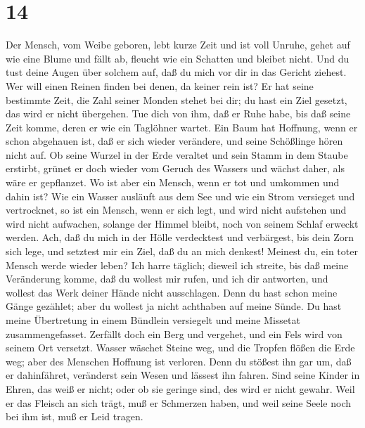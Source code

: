 \hypertarget{section-13}{%
\section{14}\label{section-13}}

 Der Mensch, vom Weibe geboren, lebt kurze Zeit und ist voll
Unruhe,  gehet auf wie eine Blume und fällt ab, fleucht wie
ein Schatten und bleibet nicht.  Und du tust deine Augen
über solchem auf, daß du mich vor dir in das Gericht ziehest.
 Wer will einen Reinen finden bei denen, da keiner rein ist?
 Er hat seine bestimmte Zeit, die Zahl seiner Monden stehet
bei dir; du hast ein Ziel gesetzt, das wird er nicht übergehen.
 Tue dich von ihm, daß er Ruhe habe, bis daß seine Zeit
komme, deren er wie ein Taglöhner wartet.  Ein Baum hat
Hoffnung, wenn er schon abgehauen ist, daß er sich wieder verändere, und
seine Schößlinge hören nicht auf.  Ob seine Wurzel in der
Erde veraltet und sein Stamm in dem Staube erstirbt,  grünet
er doch wieder vom Geruch des Wassers und wächst daher, als wäre er
gepflanzet.  Wo ist aber ein Mensch, wenn er tot und
umkommen und dahin ist?  Wie ein Wasser ausläuft aus dem
See und wie ein Strom versieget und vertrocknet,  so ist
ein Mensch, wenn er sich legt, und wird nicht aufstehen und wird nicht
aufwachen, solange der Himmel bleibt, noch von seinem Schlaf erweckt
werden.  Ach, daß du mich in der Hölle verdecktest und
verbärgest, bis dein Zorn sich lege, und setztest mir ein Ziel, daß du
an mich denkest!  Meinest du, ein toter Mensch werde wieder
leben? Ich harre täglich; dieweil ich streite, bis daß meine Veränderung
komme,  daß du wollest mir rufen, und ich dir antworten,
und wollest das Werk deiner Hände nicht ausschlagen.  Denn
du hast schon meine Gänge gezählet; aber du wollest ja nicht achthaben
auf meine Sünde.  Du hast meine Übertretung in einem
Bündlein versiegelt und meine Missetat zusammengefasset. 
Zerfällt doch ein Berg und vergehet, und ein Fels wird von seinem Ort
versetzt.  Wasser wäschet Steine weg, und die Tropfen
flößen die Erde weg; aber des Menschen Hoffnung ist verloren.
 Denn du stößest ihn gar um, daß er dahinfähret, veränderst
sein Wesen und lässest ihn fahren.  Sind seine Kinder in
Ehren, das weiß er nicht; oder ob sie geringe sind, des wird er nicht
gewahr.  Weil er das Fleisch an sich trägt, muß er
Schmerzen haben, und weil seine Seele noch bei ihm ist, muß er Leid
tragen.

